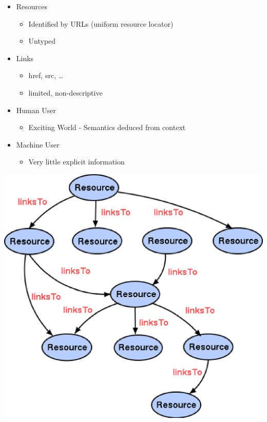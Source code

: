 \documentclass[a4paper,landscape,headrule,footrule,xetex]{foils}
\begin{document}
\begin{itemize}
\item Resources
  \begin{itemize}
  \item Identified by URLs (uniform resource locator)
  \item Untyped
  \end{itemize}
\item Links
  \begin{itemize}
  \item href, src, \ldots
  \item limited, non-descriptive
  \end{itemize}
\item Human User
  \begin{itemize}
  \item Exciting World - Semantics deduced from context
  \end{itemize}
\item Machine User
  \begin{itemize}
  \item Very little explicit information
  \end{itemize}
\end{itemize}
\newpage

\includegraphics[height=\textheight]{../pics/currentweb.eps}
\end{document}
